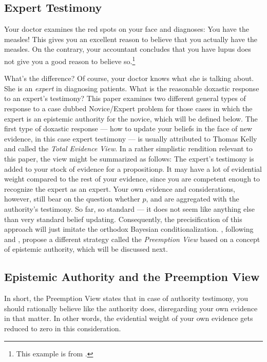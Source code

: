 \documentclass[11pt, a4paper]{scrartcl}
\renewcommand{\i}[1]{\emph{#1}}
\begin{document}
\subsection{Expert Testimony}
Your doctor examines the red spots on your face and diagnoses: You have the measles! This gives you an excellent reason to believe that you actually have the measles. On the contrary, your accountant concludes that you have lupus does not give you a good reason to believe so.\footnote{This example is from \textcite{Constantin2017}.}

What's the difference? Of course, your doctor knows what she is talking about. She is an \i{expert} in diagnosing patients. What is the reasonable doxastic response to an expert's testimony? This paper examines two different general types of response to a case dubbed Novice/Expert problem \parencite{Goldman2001} for those cases in which the expert is an epistemic authority for the novice, which will be defined below. The first type of doxastic response --- how to update your beliefs in the face of new evidence, in this case expert testimony --- is usually attributed to Thomas Kelly \parencite{Kelly2010-KELPDA} and called the \i{Total Evidence View}. In a rather simplistic rendition relevant to this paper, the view might be summarized as follows: The expert's testimony is added to your stock of evidence for a proposition$p$. It may have a lot of evidential weight compared to the rest of your evidence, since you are competent enough to recognize the expert as an expert. Your own evidence and considerations, however, still bear on the question whether $p$, and are aggregated with the authority's testimony. So far, so standard --- it does not seem like anything else than very standard belief updating. Consequently, the precisification of this approach will just imitate the orthodox Bayesian conditionalization. \textcite{Constantin2017}, following \textcite{Zagzebski2012-ZAGEAA} and \textcite{Keren2014-KERTAB}, propose a different strategy called the \i{Preemption View} based on a concept of epistemic authority, which will be discussed next.

\subsection{Epistemic Authority and the Preemption View}\label{sec:undercut}

In short, the Preemption View states that in case of authority testimony, you should rationally believe like the authority does, disregarding your own evidence in that matter. In other words, the evidential weight of your own evidence gets reduced to zero in this consideration.
\end{document}
